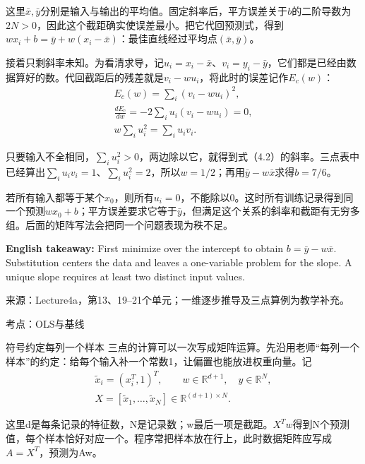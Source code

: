 这里\(\bar x,\bar y\)分别是输入与输出的平均值。固定斜率后，平方误差关于\(b\)的二阶导数为\(2N>0\)，因此这个截距确实使误差最小。把它代回预测式，得到\(wx_i+b=\bar y+w(x_i-\bar x)\)：最佳直线经过平均点\((\bar x,\bar y)\)。


接着只剩斜率未知。为看清求导，记\(u_i=x_i-\bar x\)、\(v_i=y_i-\bar y\)，它们都是已经由数据算好的数。代回截距后的残差就是\(v_i-wu_i\)，将此时的误差记作\(E_c(w)\)：
\[
\begin{gathered}
E_c(w)=\sum_i(v_i-wu_i)^2,\\
\frac{dE_c}{dw}=-2\sum_i u_i(v_i-wu_i)=0,\\
w\sum_i u_i^2=\sum_i u_i v_i.
\end{gathered}\tag{4.3b}
\]


只要输入不全相同，\(\sum_i u_i^2>0\)，两边除以它，就得到式（4.2）的斜率。三点表中已经算出\(\sum_i u_i v_i=1\)、\(\sum_i u_i^2=2\)，所以\(w=1/2\)；再用\(\bar y-w\bar x\)求得\(b=7/6\)。


若所有输入都等于某个\(x_0\)，则所有\(u_i=0\)，不能除以0。这时所有训练记录得到同一个预测\(wx_0+b\)；平方误差要求它等于\(\bar y\)，但满足这个关系的斜率和截距有无穷多组。后面的矩阵写法会把同一个问题表现为秩不足。


\textbf{English takeaway:} First minimize over the intercept to obtain \(b=\bar y-w\bar x\). Substitution centers the data and leaves a one-variable problem for the slope. A unique slope requires at least two distinct input values.


来源：Lecture4a，第13、19–21个单元；一维逐步推导及三点算例为教学补充。








考点：OLS与基线

\begin{StudyBlock}{符号约定}{每列一个样本}
三点的计算可以一次写成矩阵运算。先沿用老师“每列一个样本”的约定：给每个输入补一个常数1，让偏置也能放进权重向量。记
\[
\begin{gathered}\tilde x_i=(x_i^T,1)^T,\qquad w\in\mathbb R^{d+1},\quad y\in\mathbb R^N,\\[3pt]
X=[\tilde x_1,\ldots,\tilde x_N]\in\mathbb R^{(d+1)\times N}.\end{gathered}\tag{4.4}
\]


这里d是每条记录的特征数，N是记录数；w最后一项是截距。\(X^Tw\)得到N个预测值，每个样本恰好对应一个。程序常把样本放在行上，此时数据矩阵应写成 \(A=X^T\)，预测为Aw。
\end{StudyBlock}

